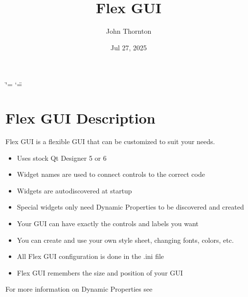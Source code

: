 \documentclass[letterpaper,10pt,english]{sphinxmanual}
\title{Flex GUI}
\date{Jul 27, 2025}
\author{John Thornton}
\begin{document}
\ifdefined\shorthandoff
  \ifnum\catcode`\=\string=\active\shorthandoff{=}\fi
  \ifnum\catcode`\"=\active{}\fi
\fi

\pagestyle{empty}
\sphinxmaketitle
\pagestyle{plain}
\sphinxtableofcontents
\pagestyle{normal}
\label{\detokenize{index::doc}}


\sphinxstepscope


\chapter{Flex GUI Description}
\label{\detokenize{description:flex-gui-description}}\label{\detokenize{description::doc}}
\sphinxAtStartPar
Flex GUI is a flexible GUI that can be customized to suit your needs.
\begin{itemize}
\item {} 
\sphinxAtStartPar
Uses stock Qt Designer 5 or 6

\item {} 
\sphinxAtStartPar
Widget names are used to connect controls to the correct code

\item {} 
\sphinxAtStartPar
Widgets are auto\sphinxhyphen{}discovered at startup

\item {} 
\sphinxAtStartPar
Special widgets only need Dynamic Properties to be discovered and created

\item {} 
\sphinxAtStartPar
Your GUI can have exactly the controls and labels you want

\item {} 
\sphinxAtStartPar
You can create and use your own style sheet, changing fonts, colors, etc.

\item {} 
\sphinxAtStartPar
All Flex GUI configuration is done in the .ini file

\item {} 
\sphinxAtStartPar
Flex GUI remembers the size and position of your GUI

\end{itemize}

\sphinxAtStartPar
For more information on Dynamic Properties see {\hyperref[\detokenize{property::doc}]{}}
\end{document}

